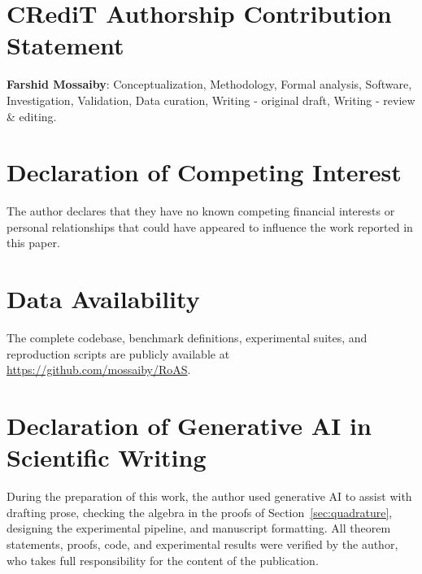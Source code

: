 \documentclass[preprint,12pt]{elsarticle}
\begin{document}
\section*{CRediT Authorship Contribution Statement}
\textbf{Farshid Mossaiby}: Conceptualization, Methodology, Formal analysis, Software, Investigation, Validation, Data curation, Writing - original draft, Writing - review \& editing.

\section*{Declaration of Competing Interest}
The author declares that they have no known competing financial interests or personal relationships that could have appeared to influence the work reported in this paper.

\section*{Data Availability}
The complete codebase, benchmark definitions, experimental suites, and reproduction scripts are publicly available at \url{https://github.com/mossaiby/RoAS}.

\section*{Declaration of Generative AI in Scientific Writing}
During the preparation of this work, the author used generative AI to assist with drafting prose, checking the algebra in the proofs of Section~\ref{sec:quadrature}, designing the experimental pipeline, and manuscript formatting. All theorem statements, proofs, code, and experimental results were verified by the author, who takes full responsibility for the content of the publication.



\end{document}
